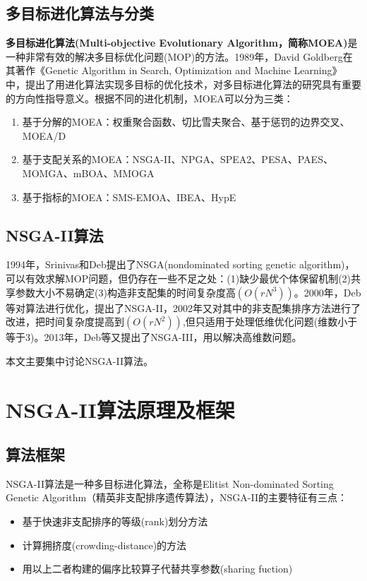 \documentclass[lang=cn,a4paper,citestyle=gb7714-2015, bibstyle=gb7714-2015]{elegantpaper}
\newcommand{\mycite}[1]{\textsuperscript{\parencite{#1}}}
\begin{document}
    \subsection{多目标进化算法与分类}
    \textbf{多目标进化算法(Multi-objective Evolutionary Algorithm，简称MOEA)}是一种非常有效的解决多目标优化问题(MOP)的方法。1989年，David Goldberg在其著作《Genetic Algorithm in Search, Optimization and Machine Learning\mycite{goldberg1989genetic}》中，提出了用进化算法实现多目标的优化技术，对多目标进化算法的研究具有重要的方向性指导意义。根据不同的进化机制，MOEA可以分为三类\mycite{郑金华2017多目标进化优化}：
    \begin{enumerate}
        \item 基于分解的MOEA：权重聚合函数、切比雪夫聚合、基于惩罚的边界交叉、MOEA/D
        \item 基于支配关系的MOEA：NSGA-II、NPGA、SPEA2、PESA、PAES、MOMGA、mBOA、MMOGA
        \item 基于指标的MOEA：SMS-EMOA、IBEA、HypE
    \end{enumerate}

    \subsection{NSGA-II算法}
    1994年，Srinivas和Deb提出了NSGA(nondominated sorting genetic algorithm)\mycite{NSGA}，可以有效求解MOP问题，但仍存在一些不足之处：(1)缺少最优个体保留机制(2)共享参数大小不易确定(3)构造非支配集的时间复杂度高$(O(rN^3))$。2000年，Deb等对算法进行优化，提出了NSGA-II\mycite{NSGA2prototype}，2002年又对其中的非支配集排序方法进行了改进\mycite{NSGA2}，把时间复杂度提高到$(O(rN^2))$,但只适用于处理低维优化问题(维数小于等于3)。2013年，Deb等又提出了NSGA-III\mycite{NSGA3}，用以解决高维数问题。

    本文主要集中讨论NSGA-II算法。

    \section{NSGA-II算法原理及框架}
    \subsection{算法框架}
    NSGA-II算法是一种多目标进化算法，全称是Elitist Non-dominated Sorting Genetic Algorithm（精英非支配排序遗传算法），NSGA-II的主要特征有三点：
    \begin{itemize}
        \item 基于快速非支配排序的等级(rank)划分方法
        \item 计算拥挤度(crowding-distance)的方法
        \item 用以上二者构建的偏序比较算子代替共享参数(sharing fuction)
    \end{itemize}
\end{document}
